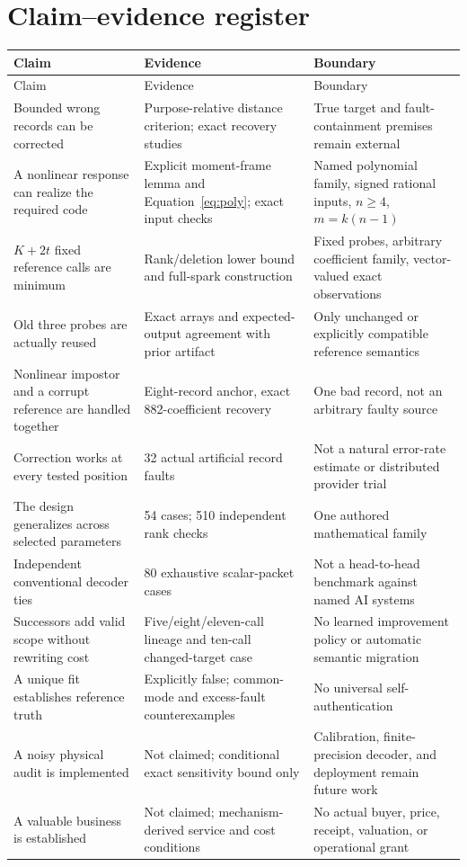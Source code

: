 \documentclass[11pt,letterpaper]{article}
\theoremstyle{remark}\newtheorem{remark}{Remark}[section]
\begin{document}
\clearpage
\section{Claim--evidence register}
\small
\begin{longtable}{@{}P{.28\linewidth}P{.33\linewidth}P{.32\linewidth}@{}}\toprule
Claim & Evidence & Boundary\\\midrule\endfirsthead
\toprule Claim & Evidence & Boundary\\\midrule\endhead
Bounded wrong records can be corrected & Purpose-relative distance criterion; exact recovery studies & True target and fault-containment premises remain external\\
A nonlinear response can realize the required code & Explicit moment-frame lemma and Equation~\eqref{eq:poly}; exact input checks & Named polynomial family, signed rational inputs, $n\ge4$, $m=k(n-1)$\\
$K+2t$ fixed reference calls are minimum & Rank/deletion lower bound and full-spark construction & Fixed probes, arbitrary coefficient family, vector-valued exact observations\\
Old three probes are actually reused & Exact arrays and expected-output agreement with prior artifact & Only unchanged or explicitly compatible reference semantics\\
Nonlinear impostor and a corrupt reference are handled together & Eight-record anchor, exact 882-coefficient recovery & One bad record, not an arbitrary faulty source\\
Correction works at every tested position & 32 actual artificial record faults & Not a natural error-rate estimate or distributed provider trial\\
The design generalizes across selected parameters & 54 cases; 510 independent rank checks & One authored mathematical family\\
Independent conventional decoder ties & 80 exhaustive scalar-packet cases & Not a head-to-head benchmark against named AI systems\\
Successors add valid scope without rewriting cost & Five/eight/eleven-call lineage and ten-call changed-target case & No learned improvement policy or automatic semantic migration\\
A unique fit establishes reference truth & Explicitly false; common-mode and excess-fault counterexamples & No universal self-authentication\\
A noisy physical audit is implemented & Not claimed; conditional exact sensitivity bound only & Calibration, finite-precision decoder, and deployment remain future work\\
A valuable business is established & Not claimed; mechanism-derived service and cost conditions & No actual buyer, price, receipt, valuation, or operational grant\\\bottomrule
\end{longtable}
\normalsize
\end{document}
